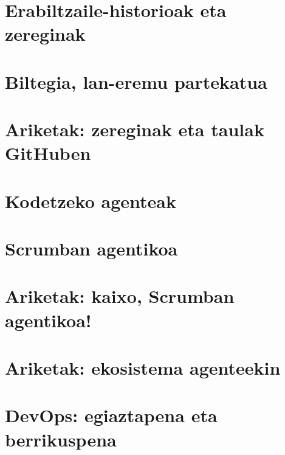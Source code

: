 \documentclass[12pt,fleqn]{book} %
\begin{document}
\chapter{Erabiltzaile-historioak eta zereginak}\label{cha:zereginak}


\chapter{Biltegia, lan-eremu partekatua}\label{cha:biltegia}


\chapter{Ariketak: zereginak eta taulak GitHuben}\label{cha:taula}


\chapter{Kodetzeko agenteak}\label{cha:agenteak}


\chapter{Scrumban agentikoa}\label{cha:scrumban}


\chapter{Ariketak: kaixo, Scrumban agentikoa!}\label{cha:kaixo}


\chapter{Ariketak: ekosistema agenteekin}\label{cha:ekosistema}


\chapter{DevOps: egiaztapena eta berrikuspena}\label{cha:devops}

\end{document}

